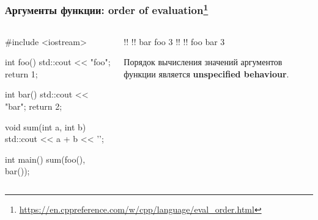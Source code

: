 \documentclass[compress, 8pt]{beamer}
\begin{document}
\begin{frame}[fragile]

    \frametitle{Аргументы функции: order of evaluation\footnote{\url{https://en.cppreference.com/w/cpp/language/eval\_order.html}}}

    \begin{columns}[T]

        \begin{column}{0.5\textwidth}

            \begin{myinplacelisting}[minted language=cpp]
#include <iostream>

int foo() {
    std::cout << "foo\n";
    return 1;
}

int bar() {
    std::cout << "bar\n";
    return 2;
}

void sum(int a, int b) {
    std::cout << a + b
        << '\n';
}

int main() {
    sum(foo(), bar());
}
            \end{myinplacelisting}

        \end{column}

        \begin{column}{0.5\textwidth}

            \begin{terminalwindow}
!!
!!
bar
foo
3
!!
!!
foo
bar
3
            \end{terminalwindow}

            Порядок вычисления значений аргументов функции является
            \textbf{unspecified behaviour}\footnotemark{}.


        \end{column}

    \end{columns}
    
\end{frame}
\end{document}
